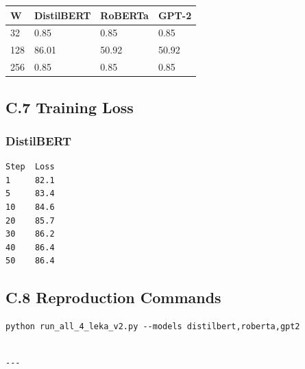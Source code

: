 \begin{table}[H]
\centering
\small
\begin{tabular}{llll}
\toprule
\textbf{W} & \textbf{DistilBERT} & \textbf{RoBERTa} & \textbf{GPT-2} \\
\midrule
32 & 0.85 & 0.85 & 0.85 \\
128 & 86.01 & 50.92 & 50.92 \\
256 & 0.85 & 0.85 & 0.85 \\
\bottomrule
\end{tabular}
\end{table}

\subsection{C.7 Training Loss}

\subsubsection{DistilBERT}
\begin{lstlisting}
Step  Loss
1     82.1
5     83.4
10    84.6
20    85.7
30    86.2
40    86.4
50    86.4
\end{lstlisting}

\subsection{C.8 Reproduction Commands}

\begin{lstlisting}
python run_all_4_leka_v2.py --models distilbert,roberta,gpt2
\end{lstlisting}
\begin{lstlisting}

---
\end{lstlisting}